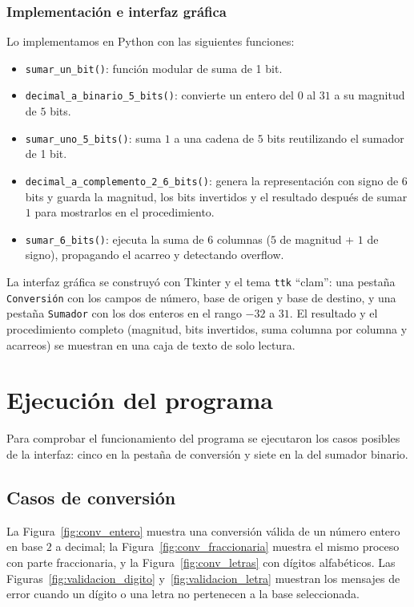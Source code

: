 \documentclass[a4paper,12pt]{article}
\begin{document}
\subsubsection{Implementaci\'{o}n e interfaz gr\'{a}fica}

Lo implementamos en Python con las siguientes funciones:
\begin{itemize}
    \item \texttt{sumar\_un\_bit()}: funci\'{o}n modular de suma de 1 bit.
    \item \texttt{decimal\_a\_binario\_5\_bits()}: convierte un entero del $0$ al $31$ a su magnitud de $5$ bits.
    \item \texttt{sumar\_uno\_5\_bits()}: suma $1$ a una cadena de $5$ bits reutilizando el sumador de 1 bit.
    \item \texttt{decimal\_a\_complemento\_2\_6\_bits()}: genera la representaci\'{o}n con signo de $6$ bits y guarda la magnitud, los bits invertidos y el resultado despu\'{e}s de sumar $1$ para mostrarlos en el procedimiento.
    \item \texttt{sumar\_6\_bits()}: ejecuta la suma de $6$ columnas ($5$ de magnitud + $1$ de signo), propagando el acarreo y detectando overflow.
\end{itemize}

La interfaz gr\'{a}fica se construy\'{o} con Tkinter y el tema \texttt{ttk} ``clam'': una pesta\~{n}a \texttt{Conversi\'{o}n} con los campos de n\'{u}mero, base de origen y base de destino, y una pesta\~{n}a \texttt{Sumador} con los dos enteros en el rango $-32$ a $31$. El resultado y el procedimiento completo (magnitud, bits invertidos, suma columna por columna y acarreos) se muestran en una caja de texto de solo lectura.

\section{Ejecuci\'{o}n del programa}

Para comprobar el funcionamiento del programa se ejecutaron los casos posibles de la interfaz: cinco en la pesta\~{n}a de conversi\'{o}n y siete en la del sumador binario.

\subsection{Casos de conversi\'{o}n}

La Figura~\ref{fig:conv_entero} muestra una conversi\'{o}n v\'{a}lida de un n\'{u}mero entero en base $2$ a decimal; la Figura~\ref{fig:conv_fraccionaria} muestra el mismo proceso con parte fraccionaria, y la Figura~\ref{fig:conv_letras} con d\'{i}gitos alfab\'{e}ticos. Las Figuras~\ref{fig:validacion_digito} y~\ref{fig:validacion_letra} muestran los mensajes de error cuando un d\'{i}gito o una letra no pertenecen a la base seleccionada.
\end{document}
